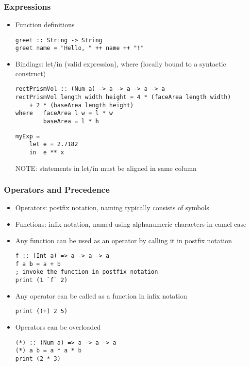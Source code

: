 \documentclass[titlepage,12pt]{article}
\newcommand{\bi}{\begin{itemize}}
\newcommand{\ei}{\end{itemize}}
\begin{document}
\subsubsection{Expressions}
\bi
    \item Function definitions
\begin{verbatim}
greet :: String -> String
greet name = "Hello, " ++ name ++ "!"
\end{verbatim}
    \item Bindings: let/in (valid expression), where (locally bound to a syntactic construct)
\begin{verbatim}
rectPrismVol :: (Num a) -> a -> a -> a -> a
rectPrismVol length width height = 4 * (faceArea length width)
    + 2 * (baseArea length height)
where   faceArea l w = l * w
        baseArea = l * h
\end{verbatim}
\begin{verbatim}
myExp =
    let e = 2.7182
    in  e ** x
\end{verbatim}
NOTE: statements in let/in must be aligned in same column
\ei

\subsubsection{Operators and Precedence}
\bi
    \item Operators: postfix notation, naming typically consists of symbols
    \item Functions: infix notation, named using alphanumeric characters in camel case
    \item Any function can be used as an operator by calling it in postfix notation
\begin{verbatim}
f :: (Int a) => a -> a -> a
f a b = a + b
; invoke the function in postfix notation
print (1 `f` 2)
\end{verbatim}
    \item Any operator can be called as a function in infix notation
\begin{verbatim}
print ((+) 2 5)
\end{verbatim}
    \item Operators can be overloaded
\begin{verbatim}
(*) :: (Num a) => a -> a -> a
(*) a b = a * a * b
print (2 * 3)
\end{verbatim}
\ei
\end{document}
